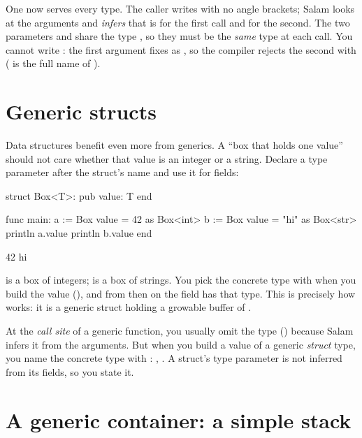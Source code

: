 One  now serves every type. The caller writes  with
no angle brackets; Salam looks at the arguments and \emph{infers} that  is
 for the first call and  for the second. The two parameters
 and  share the type , so they must be the \emph{same}
type at each call. You cannot write : the first argument
fixes  as , so the compiler rejects the second with
 ( is the full name of ).

\section{Generic structs}

Data structures benefit even more from generics. A ``box that holds one value''
should not care whether that value is an integer or a string. Declare a type
parameter after the struct's name and use it for fields:

\begin{salamen}
struct Box<T>:
    pub value: T
end

func main:
    a := Box { value = 42 } as Box<int>
    b := Box { value = "hi" } as Box<str>
    println a.value
    println b.value
end
\end{salamen}

\begin{progout}
42
hi
\end{progout}

 is a box of integers;  is a box of strings. You
pick the concrete type with  when you build the value
(), and from then on the field  has that type. This is precisely how
 works: it is a generic struct holding a growable buffer of
.

\begin{note}
At the \emph{call site} of a generic function, you usually omit the type
() because Salam infers it from the arguments. But when you
build a value of a generic \emph{struct} type, you name the concrete type with
: ,
. A struct's type parameter is not inferred
from its fields, so you state it.
\end{note}

\section{A generic container: a simple stack}

